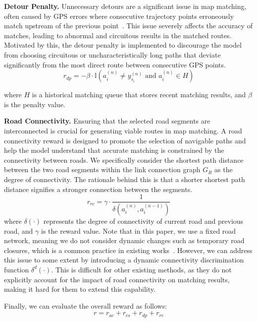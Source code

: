 \textbf{Detour Penalty.} Unnecessary detours are a significant issue in map matching, often caused by GPS errors where consecutive trajectory points erroneously match upstream of the previous point~\cite{mmsurvey,LHMM,DMM,AMM}. This issue severely affects the accuracy of matches, leading to abnormal and circuitous results in the matched routes. Motivated by this, the detour penalty is implemented to discourage the model from choosing circuitous or uncharacteristically long paths that deviate significantly from the most direct route between consecutive GPS points.
\begin{equation}
    r_{dp} = -\beta \cdot \mathbb{I}(a_i^{(n)} \neq y_{s_i}^{(n)} \text{ and } a_i^{(n)} \in H)
\end{equation}

where $H$ is a historical matching queue that stores recent matching results, and $\beta$ is the penalty value.

\textbf{Road Connectivity.} Ensuring that the selected road segments are interconnected is crucial for generating viable routes in map matching. A road connectivity reward is designed to promote the selection of navigable paths and help the model understand that accurate matching is constrained by the connectivity between roads. We specifically consider the shortest path distance between the two road segments within the link connection graph $G_R$ as the degree of connectivity. The rationale behind this is that a shorter shortest path distance signifies a stronger connection between the segments.
\begin{equation}
    r_{rc} = \gamma \cdot \frac{1}{\delta(a_i^{(n)}, a_i^{(n-1)})}
\end{equation}
where $\delta(\cdot)$ represents the degree of connectivity of current road and previous road, and $\gamma$ is the reward value. Note that in this paper, we use a fixed road network, meaning we do not consider dynamic changes such as temporary road closures, which is a common practice in existing works~\cite{mtrajrec,l2mm,graphmm, AMM}. However, we can address this issue to some extent by introducing a dynamic connectivity discrimination function $\delta^d(\cdot)$. This is difficult for other existing methods, as they do not explicitly account for the impact of road connectivity on matching results, making it hard for them to extend this capability.

Finally, we can evaluate the overall reward as follows:
\begin{equation}
    r = r_{ac} + r_{cs} + r_{dp} + r_{rc}
\end{equation}

